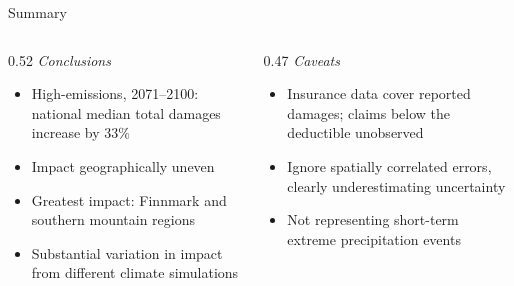 \begin{frame}{Summary}
  \vspace{1.0cm}
  \begin{columns}[T,onlytextwidth]
    \begin{column}{0.52\textwidth}
      \textit{Conclusions}
      \begin{itemize}
        \item High-emissions, 2071--2100: national median total
          damages increase by $33\%$
        \item Impact geographically uneven
        \item Greatest impact: Finnmark and southern
          mountain regions
        \item Substantial variation in impact from different climate simulations
      \end{itemize}
    \end{column}
    \begin{column}{0.47\textwidth}
      \textit{Caveats}
      \begin{itemize}
        \item Insurance data cover reported damages; claims below
          the deductible unobserved
        \item Ignore spatially correlated errors,
          clearly underestimating uncertainty
        \item Not representing short-term extreme precipitation events
      \end{itemize}
    \end{column}
  \end{columns}
\end{frame}
